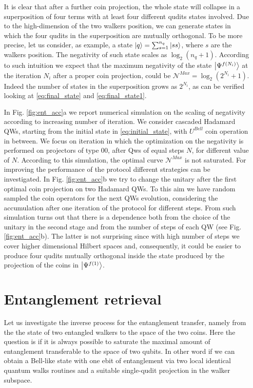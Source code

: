\documentclass[
	aps, pra,
	superscriptaddress, twocolumn,
	floatfix,
	10pt
]{revtex4-1}
\begin{document}
It is clear that after a further coin projection, the whole state will collapse in a superposition of four terms with at least four different qudits states involved.
Due to the high-dimension of the two walkers position, we can generate states in which the four qudits in the superposition are mutually orthogonal. To be more precise,
let us consider, as example, a state $\ket{q} = \sum_{s =1}^{n_q} \ket{ss}$, where $s$ are the walkers position. The negativity of such state scales as $\log_2(n_q + 1)$. According to such intuition we expect that the maximum negativity of the state $\ket{\Psi^{f(N_i)}}$ at the iteration $N_i$ after a proper coin projection, could be $\mathcal{N}^{Max} =\log_2( 2^{N_i}+1)$. Indeed the number of states in the superposition grows as $2^{N_i}$, as can be verified looking at \eqref{eq:final_state} and \eqref{eq:final_state1}.

In Fig. \ref{fig:ent_acc}a we report numerical simulation on the scaling of negativity according to increasing number of iteration. We consider cascaded Hadamard QWs, starting from the initial state in \eqref{eq:initial_state}, with $U^{Bell}$ coin operation in between. We focus on iteration in which the optimization on the negativity is performed on projectors of type $00$, after Qws of equal steps $N$, for different value of $N$. According to this simulation, the optimal curve $\mathcal{N}^{Max}$ is not saturated. For improving the performance of the protocol different strategies can be investigated. In 
Fig. \ref{fig:ent_acc}b we try to change the unitary after the first optimal coin projection on two Hadamard QWs. To this aim 
we have random sampled the coin operators for the next QWs evolution, considering the accumulation after one iteration of the protocol for different steps. From such simulation turns out that there is a dependence both from the choice of the unitary in the second stage and from the number of steps of each QW (see Fig. \ref{fig:ent_acc}b). The latter is not surprising since with high number of steps we cover higher dimensional Hilbert spaces and, consequently, it could be easier to produce four qudits mutually orthogonal inside the state produced by the projection of the coins in $\ket{\Psi^{f(1)}}$.

\section{Entanglement retrieval}
\label{sec:entanglement_retrieval}

Let us investigate the inverse process for the entanglement transfer, namely from the the state of two entangled walkers to the space of the two coins. Here the question is if it is always possible to saturate the maximal amount of entanglement transferable to the space of two qubits. In other word if we can obtain a Bell-like state with one ebit of entanglement via two local identical quantum walks routines and a suitable single-qudit projection in the walker subspace. 
\end{document}
